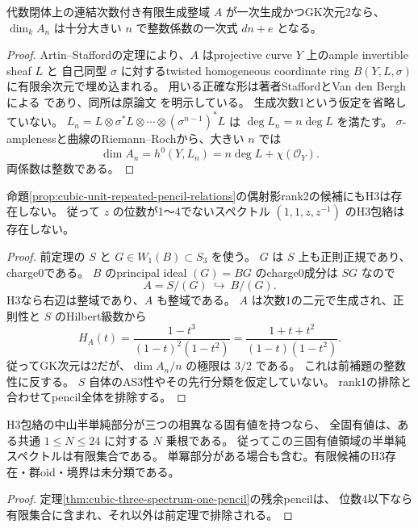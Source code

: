 \begin{lemma}
\label{lem:cubic-GK2-integral-slope}
代数閉体上の連結次数付き有限生成整域 $A$ が一次生成かつGK次元2なら、
$\dim_k A_n$ は十分大きい $n$ で整数係数の一次式 $dn+e$ となる。
\end{lemma}
\begin{proof}
Artin--Staffordの定理により、$A$ はprojective curve $Y$ 上のample invertible sheaf $L$ と
自己同型 $\sigma$ に対するtwisted homogeneous coordinate ring
$B(Y,L,\sigma)$ に有限余次元で埋め込まれる。
用いる正確な形は著者StaffordとVan den Berghによる
\cite[Theorem 5.2, p.14]{StaffordVdBCurves}であり、同所は原論文
\cite[Theorem 0.2]{ArtinStaffordGrowth}を明示している。
生成次数1という仮定を省略していない。
$L_n=L\otimes\sigma^*L\otimes\cdots\otimes(\sigma^{n-1})^*L$ は
$\deg L_n=n\deg L$ を満たす。
$\sigma$-amplenessと曲線のRiemann--Rochから、大きい $n$ では
\[
 \dim A_n=h^0(Y,L_n)=n\deg L+\chi(\mathcal O_Y).
\]
両係数は整数である。
\end{proof}

\begin{theorem}
\label{thm:cubic-unit-pencil-even-rank2-empty}
命題\ref{prop:cubic-unit-repeated-pencil-relations}の偶射影rank2の候補にもH3は存在しない。
従って $z$ の位数が1〜4でないスペクトル $(1,1,z,z^{-1})$ のH3包絡は存在しない。
\end{theorem}
\begin{proof}
前定理の $S$ と $G\in W_1(B)\subset S_3$ を使う。
$G$ は $S$ 上も正則正規であり、charge0である。
$B$ のprincipal ideal $(G)=BG$ のcharge0成分は $SG$ なので
\[
 A=S/(G)\ \hookrightarrow\ B/(G).
\]
H3なら右辺は整域であり、$A$ も整域である。
$A$ は次数1の二元で生成され、正則性と $S$ のHilbert級数から
\[
 H_A(t)=\frac{1-t^3}{(1-t)^2(1-t^2)}
       =\frac{1+t+t^2}{(1-t)(1-t^2)}.
\]
従ってGK次元は2だが、$\dim A_n/n$ の極限は $3/2$ である。
これは前補題の整数性に反する。
$S$ 自体のAS3性やその先行分類を仮定していない。
rank1の排除と合わせてpencil全体を排除する。
\end{proof}

\begin{corollary}
\label{cor:cubic-three-eigenvalues-finite-order}
H3包絡の中山半単純部分が三つの相異なる固有値を持つなら、
全固有値は、ある共通 $1\le N\le24$ に対する $N$ 乗根である。
従ってこの三固有値領域の半単純スペクトルは有限集合である。
単冪部分がある場合も含む。有限候補のH3存在・群oid・境界は未分類である。
\end{corollary}
\begin{proof}
定理\ref{thm:cubic-three-spectrum-one-pencil}の残余pencilは、
位数4以下なら有限集合に含まれ、それ以外は前定理で排除される。
\end{proof}
